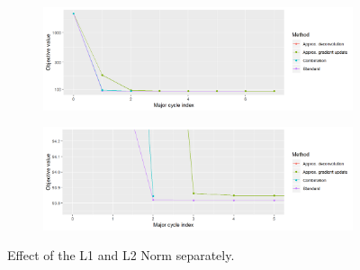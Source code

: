 \begin{figure}[h]
	\centering
	\begin{subfigure}[b]{1.0\linewidth}
		\includegraphics[width=\linewidth]{./chapters/10.results/gradient/comparison.png}
	\end{subfigure}
	\begin{subfigure}[b]{1.0\linewidth}
		\includegraphics[width=\linewidth]{./chapters/10.results/gradient/comparison_zoom.png}
	\end{subfigure}
	
	\caption{Effect of the L1 and L2 Norm separately.}
	\label{results:gradients:comparison}
\end{figure}